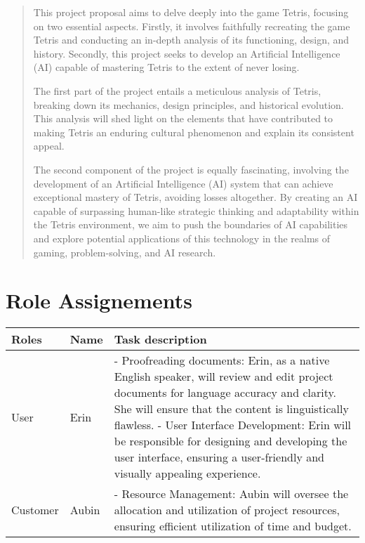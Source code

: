 \documentclass[conference]{IEEEtran}
\begin{document}
\maketitle
\begin{abstract}
This project proposal aims to delve deeply into the game Tetris, focusing on two essential aspects. Firstly, it involves faithfully recreating the game Tetris and conducting an in-depth analysis of its functioning, design, and history. Secondly, this project seeks to develop an Artificial Intelligence (AI) capable of mastering Tetris to the extent of never losing.

The first part of the project entails a meticulous analysis of Tetris, breaking down its mechanics, design principles, and historical evolution. This analysis will shed light on the elements that have contributed to making Tetris an enduring cultural phenomenon and explain its consistent appeal.

The second component of the project is equally fascinating, involving the development of an Artificial Intelligence (AI) system that can achieve exceptional mastery of Tetris, avoiding losses altogether. By creating an AI capable of surpassing human-like strategic thinking and adaptability within the Tetris environment, we aim to push the boundaries of AI capabilities and explore potential applications of this technology in the realms of gaming, problem-solving, and AI research.
\end{abstract}

\section*{Role Assignements}

\begin{center}
\begin{tabular}{ | m{1.5cm} | m{1.2cm}| m{5cm} | } 
    \hline
    Roles & Name & Task description \\
    \hline
    User & 
    Erin & 
    - Proofreading documents: Erin, as a native English speaker, will review and edit project documents for language accuracy and clarity. She will ensure that the content is linguistically flawless.
    \newline- User Interface Development: Erin will be responsible for designing and developing the user interface, ensuring a user-friendly and visually appealing experience.\\
    \hline
    Customer & 
    Aubin & 
    - Resource Management: Aubin will oversee the allocation and utilization of project resources, ensuring efficient utilization of time and budget.\\
    
\end{tabular}
\end{center}
\end{document}

